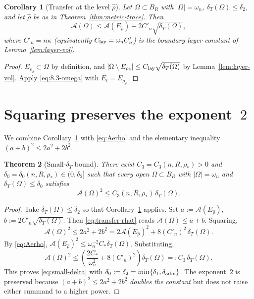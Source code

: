 \documentclass[11pt]{article}
\newtheorem{theorem}{Theorem}[section]
\newtheorem{corollary}[theorem]{Corollary}
\theoremstyle{definition}
\newcommand{\Fr}{\mathcal{A}}
\newcommand{\Om}{\Omega}
\newcommand{\rstar}{\rho_{*}}
\newcommand{\rhad}{\widehat\rho}
\begin{document}
\begin{corollary}[Transfer at the level $\rhad$]\label{cor:transfer}
Let $\Om\subset B_R$ with $|\Om|=\omega_n$,
$\delta_T(\Om)\le\delta_2$, and let $\rhad$ be as in
Theorem~\ref{thm:metric-trace}. Then
\begin{equation}\label{eq:transfer-rhat}
\Fr(\Om)\le \Fr(E_{\rhad})+2C'_n\sqrt{\delta_T(\Om)},
\end{equation}
where $C'_n=n\kappa$ (equivalently
$C_{\rm lay}=\omega_n C'_n$) is the boundary-layer constant of
Lemma~\ref{lem:layer-vol}.
\end{corollary}

\begin{proof}
$E_{\rho_\delta}\subset\Om$ by definition, and
$|\Om\setminus E_{\rho_\delta}|\le C_{\rm lay}\sqrt{\delta_T(\Om)}$ by
Lemma~\ref{lem:layer-vol}. Apply \eqref{eq:8.3-omega} with
$E_t=E_{\rho_\delta}$.
\end{proof}

\section{Squaring preserves the exponent~$2$}\label{sec:squaring}

We combine Corollary~\ref{cor:transfer} with
\eqref{eq:Aerho} and the elementary inequality
$(a+b)^2\le 2a^2+2b^2$.

\begin{theorem}[Small-$\delta_T$ bound]\label{thm:small-delta}
There exist $C_3=C_3(n,R,\rstar)>0$ and
$\delta_0=\delta_0(n,R,\rstar)\in(0,\delta_2]$ such that every open
$\Om\subset B_R$ with $|\Om|=\omega_n$ and
$\delta_T(\Om)\le \delta_0$ satisfies
\begin{equation}\label{eq:small-delta}
\Fr(\Om)^{2}\le C_3(n,R,\rstar)\,\delta_T(\Om).
\end{equation}
\end{theorem}

\begin{proof}
Take $\delta_T(\Om)\le\delta_2$ so that
Corollary~\ref{cor:transfer} applies. Set
$a:=\Fr(E_{\rhad})$, $b:=2C'_n\sqrt{\delta_T(\Om)}$.
Then \eqref{eq:transfer-rhat} reads $\Fr(\Om)\le a+b$. Squaring,
\begin{equation}\label{eq:square}
\Fr(\Om)^2\le 2a^2+2b^2
=2\Fr(E_{\rhad})^2+8(C'_n)^{2}\,\delta_T(\Om).
\end{equation}
By \eqref{eq:Aerho},
$\Fr(E_{\rhad})^2\le \omega_n^{-2}C_*\delta_T(\Om)$. Substituting,
\begin{equation}\label{eq:final-const}
\Fr(\Om)^2\le \left(\frac{2C_*}{\omega_n^{2}}+8(C'_n)^{2}\right)\delta_T(\Om)
=:C_3\,\delta_T(\Om).
\end{equation}
This proves \eqref{eq:small-delta} with
$\delta_0:=\delta_2=\min\{\delta_1,\delta_{\rm adm}\}$. The
exponent~$2$ is preserved because $(a+b)^2\le 2a^2+2b^2$
\emph{doubles the constant} but does not raise either summand to a
higher power.
\end{proof}
\end{document}
